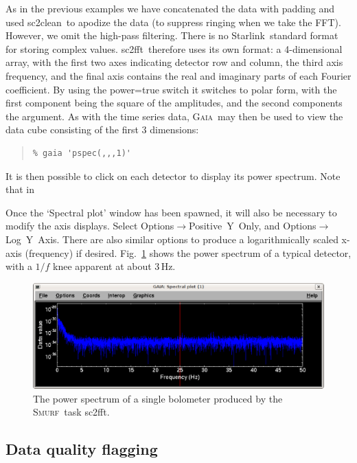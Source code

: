\documentclass[twoside,11pt]{article}
\newenvironment{myquote}{\begin{quote}\begin{small}}{\end{small}\end{quote}}
\newcommand{\starlink}{\htmladdnormallink{Starlink}{http://star-www.rl.ac.uk/}}
\newcommand{\gaia}{\xref{\textsc{Gaia}}{sun214}{}}
\newcommand{\smurf}{\xref{\textsc{Smurf}}{sun258}{}}
\newcommand{\task}[1]{\textsf{#1}}
\newcommand{\fft}{\xref{\task{sc2fft}}{sun258}{SC2FFT}}
\newcommand{\clean}{\xref{\task{sc2clean}}{sun258}{SC2CLEAN}}
\newcommand{\htmladdnormallink}[2]{#1}
\newcommand{\xref}[3]{#1}
\newcommand{\xlabel}[1]{}
\renewcommand{\_}{\texttt{\symbol{95}}}
\begin{document}
As in the previous examples we have concatenated the data with padding
and used \clean\ to apodize the data (to suppress ringing when we take
the FFT). However, we omit the high-pass filtering. There is no
\starlink\ standard format for storing complex values. \fft\ therefore
uses its own format: a 4-dimensional array, with the first two axes
indicating detector row and column, the third axis frequency, and the
final axis contains the real and imaginary parts of each Fourier
coefficient. By using the power=true switch it switches to polar form,
with the first component being the square of the amplitudes, and the
second components the argument. As with the time series data, \gaia\
may then be used to view the data cube consisting of the first 3
dimensions:

\begin{myquote}
\begin{verbatim}
% gaia 'pspec(,,,1)'
\end{verbatim}
\end{myquote}

It is then possible to click on each detector to display its power
spectrum. Note that in 

Once the `Spectral plot' window has been spawned, it will also be
necessary to modify the axis displays. Select
Options$\rightarrow$Positive~Y~Only, and
Options$\rightarrow$Log~Y~Axis.  There are also similar options to
produce a logarithmically scaled x-axis (frequency) if
desired. Fig.~\ref{fig:pspec} shows the power spectrum of a typical
detector, with a $1/f$ knee apparent at about 3\,Hz.

\begin{figure}
\begin{center}
\includegraphics[width=\linewidth]{pspec.eps}
\caption{The power spectrum of a single bolometer produced by the
  \smurf\ task \fft.}
\label{fig:pspec}
\end{center}
\end{figure}

\subsection{\xlabel{quality}Data quality flagging} 
\end{document}
